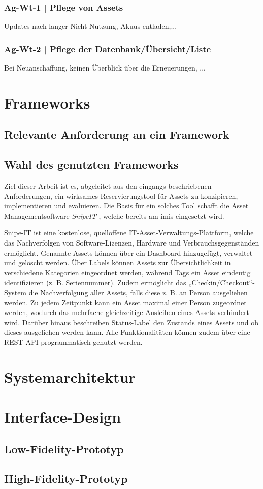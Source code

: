 \subsubsection{Ag-Wt-1 | Pflege von Assets}
\label{subsubsection:FT-Wt-1}
Updates nach langer Nicht Nutzung, Akuus entladen,...

\subsubsection{Ag-Wt-2 | Pflege der Datenbank/Übersicht/Liste}
\label{subsubsection:Ft-Wt-2}
Bei Neuanschaffung, keinen Überblick über die Erneuerungen, ...


\section{Frameworks} 

\subsection{Relevante Anforderung an ein Framework}
\subsection{Wahl des genutzten Frameworks}
Ziel dieser Arbeit ist es, abgeleitet aus den eingangs beschriebenen Anforderungen, ein wirksames
Reservierungstool für Assets zu konzipieren, implementieren und evaluieren. Die Basis für ein
solches Tool schafft die Asset Managementsoftware \textit{SnipeIT} \cite{noauthor_home_nodate},
welche bereits am \ac{imis} eingesetzt wird.

Snipe-IT ist eine kostenlose, quelloffene IT-Asset-Verwaltungs-Plattform,
welche das Nachverfolgen von Software-Lizenzen, Hardware und
Verbrauchsgegenständen ermöglicht. Genannte Assets können über ein Dashboard
hinzugefügt, verwaltet und gelöscht werden. Über Labels können Assets zur
Übersichtlichkeit in verschiedene Kategorien eingeordnet werden, während
Tags ein Asset eindeutig identifizieren (z. B. Seriennummer). Zudem ermöglicht
das „Checkin/Checkout“-System die Nachverfolgung aller Assets, falls diese
z. B.  an Person ausgeliehen werden. Zu jedem Zeitpunkt kann ein Asset
maximal einer Person zugeordnet werden, wodurch das mehrfache gleichzeitige
Ausleihen eines Assets verhindert wird. Darüber hinaus beschreiben Status-Label
den Zustands eines Assets und ob dieses ausgeliehen werden kann. Alle
Funktionalitäten können zudem über eine REST-API programmatisch genutzt werden.


\section{Systemarchitektur}

\section{Interface-Design}

\subsection{Low-Fidelity-Prototyp}

\subsection{High-Fidelity-Prototyp}